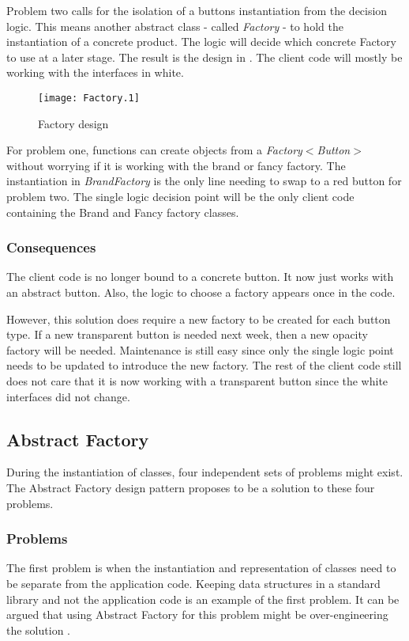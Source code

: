 Problem two calls for the isolation of a buttons instantiation from the decision logic.
This means another abstract class - called \textit{Factory} - to hold the instantiation of a concrete product.
The logic will decide which concrete Factory to use at a later stage.
The result is the design in .
The client code will mostly be working with the interfaces in white.

\begin{figure}[h]
	\centering
	\texttt{[image: Factory.1]}
	\caption{Factory design}
	\label{fig:FactoryInterface}
\end{figure}

For problem one, functions can create objects from a \textit{Factory$<$Button$>$} without worrying if it is working with the brand or fancy factory.
The instantiation in \textit{BrandFactory} is the only line needing to swap to a red button for problem two.
The single logic decision point will be the only client code containing the Brand and Fancy factory classes.

\subsubsection{Consequences}
The client code is no longer bound to a concrete button.
It now just works with an abstract button.
Also, the logic to choose a factory appears once in the code.

However, this solution does require a new factory to be created for each button type.
If a new transparent button is needed next week, then a new opacity factory will be needed.
Maintenance is still easy since only the single logic point needs to be updated to introduce the new factory.
The rest of the client code still does not care that it is now working with a transparent button since the white interfaces did not change.

\subsection{Abstract Factory}
During the instantiation of classes, four independent sets of problems might exist.
The Abstract Factory design pattern proposes to be a solution to these four problems. \cite{gamma_94_01}

\subsubsection{Problems}
The first problem is when the instantiation and representation of classes need to be separate from the application code.
Keeping data structures in a standard library and not the application code is an example of the first problem.
It can be argued that using Abstract Factory for this problem might be over-engineering the solution \cite{kerievsky_05_01}.

